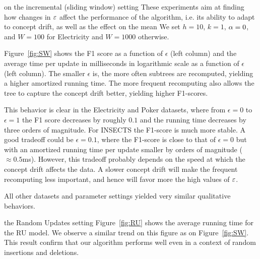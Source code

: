\begin{paragraph}{\algo{} on the incremental (sliding window) setting}
    These experiments aim at finding how changes in $\varepsilon$ affect the performance of the algorithm, i.e. its ability to adapt to concept drift, as well as the effect on the mean We set $h=10$, $k=1$, $\alpha=0$, and $W=100$ for Electricity and $W=1000$ otherwise.

    Figure~\ref{fig:SW} shows the F1 score as a function of $\epsilon$ (left column) and the average time per update in milliseconds in logarithmic scale as a function of $\epsilon$ (left column). The smaller $\epsilon$ is, the more often subtrees are recomputed, yielding a higher amortized running time. The more frequent recomputing also allows the tree to capture the concept drift better, yielding higher F1-scores.
    
    This behavior is clear in the Electricity and Poker datasets, where from $\epsilon=0$ to $\epsilon=1$ the F1 score decreases by roughly $0.1$ and the running time decreases by three orders of magnitude. For INSECTS the F1-score is much more stable. A good tradeoff could be $\epsilon=0.1$, where the F1-score is close to that of $\epsilon=0$ but with an amortized running time per update smaller by orders of magnitude ($\approx 0.5$ms). However, this tradeoff probably depends on the speed at which the concept drift affects the data. A slower concept drift will make the frequent recomputing less important, and hence will favor more the high values of $\varepsilon$.

    All other datasets and parameter settings yielded very similar qualitative behaviors. 
\end{paragraph}

\begin{paragraph}{\algo{} the Random Updates setting} 
    Figure~\ref{fig:RU} shows the average running time for the RU model. We observe a similar trend on this figure as on Figure~\ref{fig:SW}. This result confirm that our algorithm performs well even in a context of random insertions and deletions.
\end{paragraph} 

